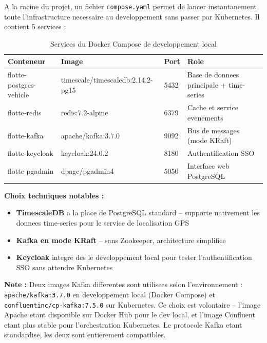 \documentclass[12pt,a4paper]{article}
\begin{document}
\vspace{0.3cm}

A la racine du projet, un fichier \texttt{compose.yaml} permet de lancer
instantanement toute l'infrastructure necessaire au developpement sans passer par
Kubernetes. Il contient 5 services :

\begin{table}[H]
  \centering
  \begin{tabular}{llll}
    \toprule
    \textbf{Conteneur} & \textbf{Image} & \textbf{Port} & \textbf{Role} \\
    \midrule
    flotte-postgres-vehicle  & timescale/timescaledb:2.14.2-pg15    & 5432 & Base de donnees principale + time-series \\
    flotte-redis     & redis:7.2-alpine                     & 6379 & Cache et service evenements \\
    flotte-kafka     & apache/kafka:3.7.0                   & 9092 & Bus de messages (mode KRaft) \\
    flotte-keycloak  & keycloak:24.0.2  & 8180 & Authentification SSO \\
    flotte-pgadmin   & dpage/pgadmin4                       & 5050 & Interface web PostgreSQL \\
    \bottomrule
  \end{tabular}
  \caption{Services du Docker Compose de developpement local}
\end{table}

\textbf{Choix techniques notables :}
\begin{itemize}
  \item \textbf{TimescaleDB} a la place de PostgreSQL standard -- supporte nativement
        les donnees time-series pour le service de localisation GPS
  \item \textbf{Kafka en mode KRaft} -- sans Zookeeper, architecture simplifiee
  \item \textbf{Keycloak} integre des le developpement local pour tester
        l'authentification SSO sans attendre Kubernetes
\end{itemize}

\begin{infobox}
\textbf{Note :} Deux images Kafka differentes sont utilisees selon l'environnement :
\texttt{apache/kafka:3.7.0} en developpement local (Docker Compose) et
\texttt{confluentinc/cp-kafka:7.5.0} sur Kubernetes. Ce choix est volontaire --
l'image Apache etant disponible sur Docker Hub pour le dev local, et l'image
Confluent etant plus stable pour l'orchestration Kubernetes. Le protocole Kafka
etant standardise, les deux sont entierement compatibles.
\end{infobox}
\end{document}
